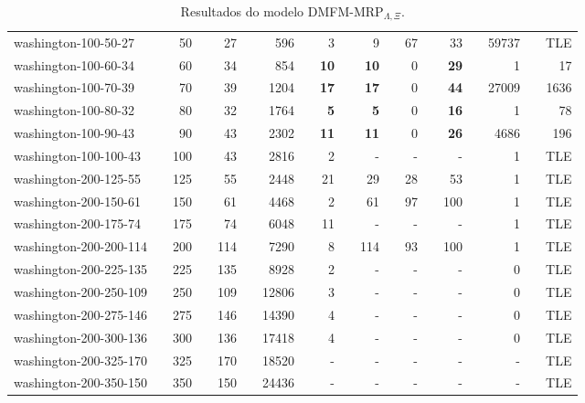 \begin{table}[!ht]
{\begin{tabular}{llrlrlrlrlrlrlrlrlr}
washington-100-50-27 &  & 50 &  & 27 &  & 596 &  & 3 &  & 9 &  & 67 &  & 33 &  & 59737 &  & TLE \\
\rowcolor[HTML]{9B9B9B} 
washington-100-60-34 &  & 60 &  & 34 &  & 854 &  & \textbf{10} &  & \textbf{10} &  & 0 &  & \textbf{29} &  & 1 &  & 17 \\
\rowcolor[HTML]{9B9B9B} 
washington-100-70-39 &  & 70 &  & 39 &  & 1204 &  & \textbf{17} &  & \textbf{17} &  & 0 &  & \textbf{44} &  & 27009 &  & 1636 \\
\rowcolor[HTML]{9B9B9B} 
washington-100-80-32 &  & 80 &  & 32 &  & 1764 &  & \textbf{5} &  & \textbf{5} &  & 0 &  & \textbf{16} &  & 1 &  & 78 \\
\rowcolor[HTML]{9B9B9B} 
washington-100-90-43 &  & 90 &  & 43 &  & 2302 &  & \textbf{11} &  & \textbf{11} &  & 0 &  & \textbf{26} &  & 4686 &  & 196 \\
washington-100-100-43 &  & 100 &  & 43 &  & 2816 &  & 2 &  & - &  & - &  & - &  & 1 &  & TLE \\ \hline
\rowcolor[HTML]{C0C0C0} 
washington-200-125-55 &  & 125 &  & 55 &  & 2448 &  & 21 &  & 29 &  & 28 &  & 53 &  & 1 &  & TLE \\
\rowcolor[HTML]{C0C0C0} 
washington-200-150-61 &  & 150 &  & 61 &  & 4468 &  & 2 &  & 61 &  & 97 &  & 100 &  & 1 &  & TLE \\
washington-200-175-74 &  & 175 &  & 74 &  & 6048 &  & 11 &  & - &  & - &  & - &  & 1 &  & TLE \\
\rowcolor[HTML]{C0C0C0} 
washington-200-200-114 &  & 200 &  & 114 &  & 7290 &  & 8 &  & 114 &  & 93 &  & 100 &  & 1 &  & TLE \\
washington-200-225-135 &  & 225 &  & 135 &  & 8928 &  & 2 &  & - &  & - &  & - &  & 0 &  & TLE \\
washington-200-250-109 &  & 250 &  & 109 &  & 12806 &  & 3 &  & - &  & - &  & - &  & 0 &  & TLE \\
washington-200-275-146 &  & 275 &  & 146 &  & 14390 &  & 4 &  & - &  & - &  & - &  & 0 &  & TLE \\
washington-200-300-136 &  & 300 &  & 136 &  & 17418 &  & 4 &  & - &  & - &  & - &  & 0 &  & TLE \\
washington-200-325-170 &  & 325 &  & 170 &  & 18520 &  & - &  & - &  & - &  & - &  & - &  & TLE \\
washington-200-350-150 &  & 350 &  & 150 &  & 24436 &  & - &  & - &  & - &  & - &  & - &  & TLE \\ \hline
\end{tabular}%
}
\caption{Resultados do modelo DMFM-MRP$_{\Lambda, \Xi}$.}
\label{tab:dmfm-lambda-xi}
\end{table}

